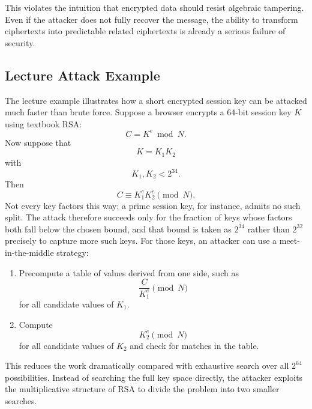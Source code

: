 This violates the intuition that encrypted data should resist algebraic tampering. Even if the attacker does not fully recover the message, the ability to transform ciphertexts into predictable related ciphertexts is already a serious failure of security.

\subsection{Lecture Attack Example}

The lecture example illustrates how a short encrypted session key can be attacked much faster than brute force. Suppose a browser encrypts a 64-bit session key $K$ using textbook RSA:
\[
C = K^e \bmod N.
\]
Now suppose that
\[
K = K_1K_2
\]
with
\[
K_1, K_2 < 2^{34}.
\]
Then
\[
C \equiv K_1^e K_2^e \pmod{N}.
\]
Not every key factors this way; a prime session key, for instance, admits no such split. The attack therefore succeeds only for the fraction of keys whose factors both fall below the chosen bound, and that bound is taken as $2^{34}$ rather than $2^{32}$ precisely to capture more such keys. For those keys, an attacker can use a meet-in-the-middle strategy:

\begin{enumerate}
\item Precompute a table of values derived from one side, such as
\[
\frac{C}{K_1^e} \pmod{N}
\]
for all candidate values of $K_1$.
\item Compute
\[
K_2^e \pmod{N}
\]
for all candidate values of $K_2$ and check for matches in the table.
\end{enumerate}

This reduces the work dramatically compared with exhaustive search over all $2^{64}$ possibilities. Instead of searching the full key space directly, the attacker exploits the multiplicative structure of RSA to divide the problem into two smaller searches.

